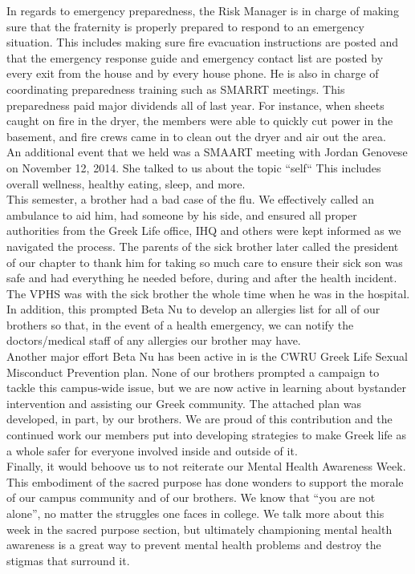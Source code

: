   In regards to emergency preparedness, the Risk Manager is in charge of making sure that the fraternity is properly prepared to respond to an emergency situation. This includes making sure fire evacuation instructions are posted and that the emergency response guide and emergency contact list are posted by every exit from the house and by every house phone. He is also in charge of coordinating preparedness training such as SMARRT meetings. This preparedness paid major dividends all of last year. For instance, when sheets caught on fire in the dryer, the members were able to quickly cut power in the basement, and fire crews came in to clean out the dryer and air out the area. \\
  
  An additional event that we held was a SMAART meeting with Jordan Genovese on November 12, 2014. She talked to us about the topic ``self`` This includes overall wellness, healthy eating, sleep, and more. \\
  
  This semester, a brother had a bad case of the flu. We effectively called an ambulance to aid him, had someone by his side, and ensured all proper authorities from the Greek Life office, IHQ and others were kept informed as we navigated the process. The parents of the sick brother later called the president of our chapter to thank him for taking so much care to ensure their sick son was safe and had everything he needed before, during and after the health incident. The VPHS was with the sick brother the whole time when he was in the hospital. In addition, this prompted Beta Nu to develop an allergies list for all of our brothers so that, in the event of a health emergency, we can notify the doctors/medical staff of any allergies our brother may have. \\

  Another major effort Beta Nu has been active in is the CWRU Greek Life Sexual Misconduct Prevention plan. None of our brothers prompted a campaign to tackle this campus-wide issue, but we are now active in learning about bystander intervention and assisting our Greek community. The attached plan was developed, in part, by our brothers. We are proud of this contribution and the continued work our members put into developing strategies to make Greek life as a whole safer for everyone involved inside and outside of it. \\

  Finally, it would behoove us to not reiterate our Mental Health Awareness Week. This embodiment of the sacred purpose has done wonders to support the morale of our campus community and of our brothers. We know that ``you are not alone'', no matter the struggles one faces in college. We talk more about this week in the sacred purpose section, but ultimately championing mental health awareness is a great way to prevent mental health problems and destroy the stigmas that surround it. \\
  